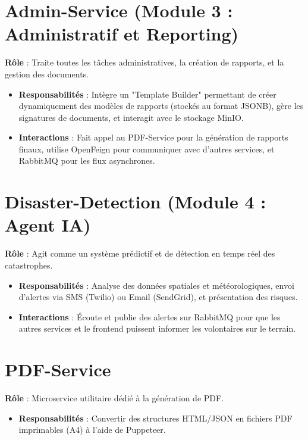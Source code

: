 \documentclass[12pt,a4paper]{report}
\begin{document}
\section{Admin-Service (Module 3 : Administratif et Reporting)}
\textbf{Rôle} : Traite toutes les tâches administratives, la création de rapports, et la gestion des documents.
\begin{itemize}
    \item \textbf{Responsabilités} : Intègre un "Template Builder" permettant de créer dynamiquement des modèles de rapports (stockés au format JSONB), gère les signatures de documents, et interagit avec le stockage MinIO.
    \item \textbf{Interactions} : Fait appel au PDF-Service pour la génération de rapports finaux, utilise OpenFeign pour communiquer avec d'autres services, et RabbitMQ pour les flux asynchrones.
\end{itemize}

\section{Disaster-Detection (Module 4 : Agent IA)}
\textbf{Rôle} : Agit comme un système prédictif et de détection en temps réel des catastrophes.
\begin{itemize}
    \item \textbf{Responsabilités} : Analyse des données spatiales et météorologiques, envoi d'alertes via SMS (Twilio) ou Email (SendGrid), et présentation des risques.
    \item \textbf{Interactions} : Écoute et publie des alertes sur RabbitMQ pour que les autres services et le frontend puissent informer les volontaires sur le terrain.
\end{itemize}

\section{PDF-Service}
\textbf{Rôle} : Microservice utilitaire dédié à la génération de PDF.
\begin{itemize}
    \item \textbf{Responsabilités} : Convertir des structures HTML/JSON en fichiers PDF imprimables (A4) à l'aide de Puppeteer.
\end{itemize}
\end{document}
